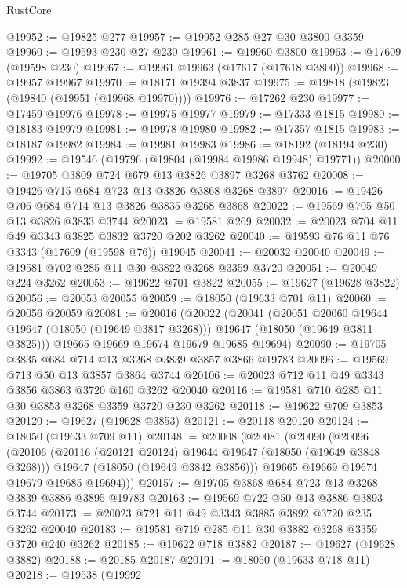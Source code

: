 \begin{lexlean}{RustCore}
\begin{coremodule}
@19952 := @19825 @277
@19957 := @19952 @285 @27 @30 @3800 @3359
@19960 := @19593 @230 @27 @230
@19961 := @19960 @3800
@19963 := @17609 (@19598 @230)
@19967 := @19961 @19963 (@17617 (@17618 @3800))
@19968 := @19957 @19967
@19970 := @18171 @19394 @3837
@19975 := @19818 (@19823 (@19840 (@19951 (@19968 @19970))))
@19976 := @17262 @230
@19977 := @17459 @19976
@19978 := @19975 @19977
@19979 := @17333 @1815
@19980 := @18183 @19979
@19981 := @19978 @19980
@19982 := @17357 @1815
@19983 := @18187 @19982
@19984 := @19981 @19983
@19986 := @18192 (@18194 @230)
@19992 := @19546 (@19796 (@19804 (@19984 @19986 @19948) @19771))
@20000 := @19705 @3809 @724 @679 @13 @3826 @3897 @3268 @3762
@20008 := @19426 @715 @684 @723 @13 @3826 @3868 @3268 @3897
@20016 := @19426 @706 @684 @714 @13 @3826 @3835 @3268 @3868
@20022 := @19569 @705 @50 @13 @3826 @3833 @3744
@20023 := @19581 @269
@20032 := @20023 @704 @11 @49 @3343 @3825 @3832 @3720 @202 @3262
@20040 := @19593 @76 @11 @76 @3343 (@17609 (@19598 @76)) @19045
@20041 := @20032 @20040
@20049 := @19581 @702 @285 @11 @30 @3822 @3268 @3359 @3720
@20051 := @20049 @224 @3262
@20053 := @19622 @701 @3822
@20055 := @19627 (@19628 @3822)
@20056 := @20053 @20055
@20059 := @18050 (@19633 @701 @11)
@20060 := @20056 @20059
@20081 := @20016
    (@20022
      (@20041
        (@20051 @20060 @19644 @19647 (@18050 (@19649 @3817 @3268)))
        @19647
        (@18050 (@19649 @3811 @3825)))
      @19665
      @19669
      @19674
      @19679
      @19685
      @19694)
@20090 := @19705 @3835 @684 @714 @13 @3268 @3839 @3857 @3866 @19783
@20096 := @19569 @713 @50 @13 @3857 @3864 @3744
@20106 := @20023 @712 @11 @49 @3343 @3856 @3863 @3720 @160 @3262 @20040
@20116 := @19581 @710 @285 @11 @30 @3853 @3268 @3359 @3720 @230 @3262
@20118 := @19622 @709 @3853
@20120 := @19627 (@19628 @3853)
@20121 := @20118 @20120
@20124 := @18050 (@19633 @709 @11)
@20148 := @20008
    (@20081
      (@20090
        (@20096
          (@20106
            (@20116 (@20121 @20124) @19644 @19647 (@18050 (@19649 @3848 @3268)))
            @19647
            (@18050 (@19649 @3842 @3856)))
          @19665
          @19669
          @19674
          @19679
          @19685
          @19694)))
@20157 := @19705 @3868 @684 @723 @13 @3268 @3839 @3886 @3895 @19783
@20163 := @19569 @722 @50 @13 @3886 @3893 @3744
@20173 := @20023 @721 @11 @49 @3343 @3885 @3892 @3720 @235 @3262 @20040
@20183 := @19581 @719 @285 @11 @30 @3882 @3268 @3359 @3720 @240 @3262
@20185 := @19622 @718 @3882
@20187 := @19627 (@19628 @3882)
@20188 := @20185 @20187
@20191 := @18050 (@19633 @718 @11)
@20218 := @19538
    (@19992

\end{coremodule}
\end{lexlean}
